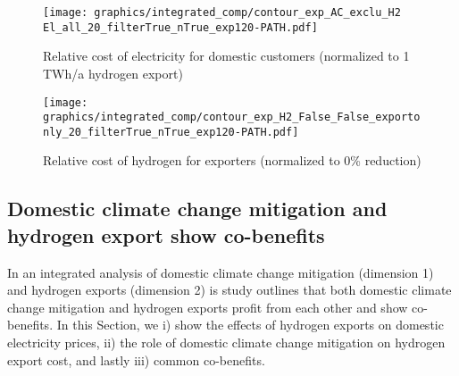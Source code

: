 \begin{figure*}[h!]
    \centering
    \begin{subfigure}[b]{0.49\linewidth}
        \centering
        \texttt{[image: graphics/integrated\_comp/contour\_exp\_AC\_exclu\_H2 El\_all\_20\_filterTrue\_nTrue\_exp120-PATH.pdf]}
        \caption{Relative cost of electricity for domestic customers (normalized to 1 TWh/a hydrogen export)}
        \label{fig:expense_ac_120}
    \end{subfigure}
    \hfill
    \begin{subfigure}[b]{0.49\linewidth}
        \centering
        \texttt{[image: graphics/integrated\_comp/contour\_exp\_H2\_False\_False\_exportonly\_20\_filterTrue\_nTrue\_exp120-PATH.pdf]}
        \caption{Relative cost of hydrogen for exporters (normalized to 0\% \co reduction)}
        \label{fig:expense_h2_120}
    \end{subfigure}
    \hfill
    \caption{  
    Cost for domestic electricity consumers (\ref{fig:expense_ac_120}) and hydrogen exporters (\ref{fig:expense_h2_120}),
    normalized to costs at 1 TWh/a hydrogen export (\ref{fig:expense_ac_120}) and
    to 0\% \co reduction (\ref{fig:expense_h2_120})
    at each domestic climate change mitigation level. Domestic electricity consumers profit from increasing hydrogen exports, especially at low domestic climate change mitigation and high exports. Hydrogen exporters profit from domestic climate change mitigation at medium mitigation efforts. Both (\ref{fig:expense_ac_120}) and (\ref{fig:expense_h2_120}) include possible pathways of i) quick exports and slow climate change mitigation, ii) balanced exports and mitigation and iii) slow exports and quick climate change mitigation. Years are illustrative.}
    \label{fig:expenses_default_120}
\end{figure*}


\subsection*{Domestic climate change mitigation and hydrogen export show co-benefits}
\label{subsec:benefits}


In an integrated analysis of domestic climate change mitigation (dimension 1) and hydrogen exports (dimension 2) is study outlines that both domestic climate change mitigation and hydrogen exports profit from each other and show co-benefits. In this Section, we i) show the effects of hydrogen exports on domestic electricity prices, ii) the role of domestic climate change mitigation on hydrogen export cost, and lastly iii) common co-benefits.

